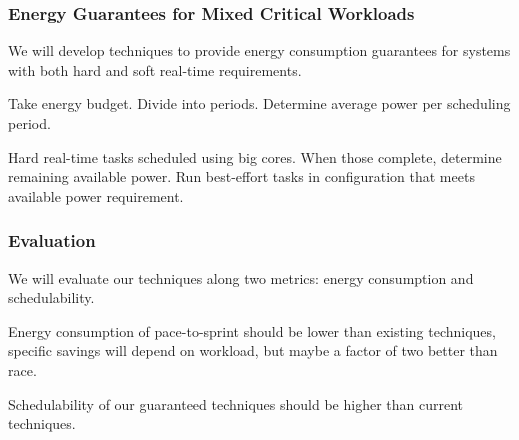 \subsubsection{Energy Guarantees for Mixed Critical Workloads}
We will develop techniques to provide energy consumption guarantees
for systems with both hard and soft real-time requirements.

Take energy budget.  Divide into periods.  Determine average power per
scheduling period.

Hard real-time tasks scheduled using big cores.  When those complete,
determine remaining available power.  Run best-effort tasks in
configuration that meets available power requirement.


\subsubsection{Evaluation}

We will evaluate our techniques along two metrics: energy consumption
and schedulability.

Energy consumption of pace-to-sprint should be lower than existing
techniques, specific savings will depend on workload, but maybe a
factor of two better than race.

Schedulability of our guaranteed techniques should be higher than
current techniques.
